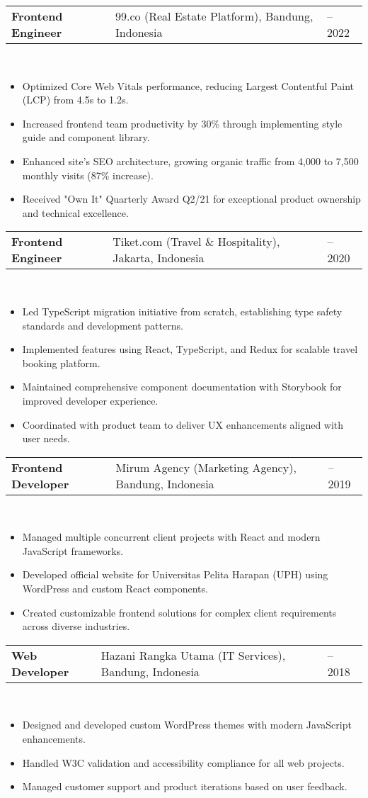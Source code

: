 \documentclass[a4paper, 11pt]{article}
\newcommand{\resumeItem}[1]{
  \item\small{
    {#1 \vspace{-2pt}}
  }
}
\newcommand{\resumeSubheading}[4]{
  \vspace{-2pt}\item
    \begin{tabularx}{0.987\textwidth}[t]{
  >{\raggedright\arraybackslash}X
  >{\centering\arraybackslash}X
  >{\raggedleft\arraybackslash}X }
      \textbf{#1} & #2 & #3 \\
    \end{tabularx}
    \textit{\small#4}\\
    \vspace{-7pt}
}
\newcommand{\resumeItemListStart}{\begin{itemize}[leftmargin=0.22in]}
\newcommand{\resumeItemListEnd}{\end{itemize}\vspace{-20pt}}
\begin{document}
        \resumeSubheading
            {Frontend Engineer}{99.co (Real Estate Platform), Bandung, Indonesia}{2020 -- 2022}{}
            \resumeItemListStart
                \resumeItem{Optimized Core Web Vitals performance, reducing Largest Contentful Paint (LCP) from 4.5s to 1.2s.}
                \resumeItem{Increased frontend team productivity by 30\% through implementing style guide and component library.}
                \resumeItem{Enhanced site's SEO architecture, growing organic traffic from 4,000 to 7,500 monthly visits (87\% increase).}
                \resumeItem{Received "Own It" Quarterly Award Q2/21 for exceptional product ownership and technical excellence.}
            \resumeItemListEnd

        \resumeSubheading
            {Frontend Engineer}{Tiket.com (Travel \& Hospitality), Jakarta, Indonesia}{2019 -- 2020}{}
            \resumeItemListStart
                \resumeItem{Led TypeScript migration initiative from scratch, establishing type safety standards and development patterns.}
                \resumeItem{Implemented features using React, TypeScript, and Redux for scalable travel booking platform.}
                \resumeItem{Maintained comprehensive component documentation with Storybook for improved developer experience.}
                \resumeItem{Coordinated with product team to deliver UX enhancements aligned with user needs.}
            \resumeItemListEnd

        \resumeSubheading
            {Frontend Developer}{Mirum Agency (Marketing Agency), Bandung, Indonesia}{2018 -- 2019}{}
            \resumeItemListStart
                \resumeItem{Managed multiple concurrent client projects with React and modern JavaScript frameworks.}
                \resumeItem{Developed official website for Universitas Pelita Harapan (UPH) using WordPress and custom React components.}
                \resumeItem{Created customizable frontend solutions for complex client requirements across diverse industries.}
            \resumeItemListEnd

        \resumeSubheading
            {Web Developer}{Hazani Rangka Utama (IT Services), Bandung, Indonesia}{2017 -- 2018}{}
            \resumeItemListStart
                \resumeItem{Designed and developed custom WordPress themes with modern JavaScript enhancements.}
                \resumeItem{Handled W3C validation and accessibility compliance for all web projects.}
                \resumeItem{Managed customer support and product iterations based on user feedback.}
            \resumeItemListEnd
\end{document}

